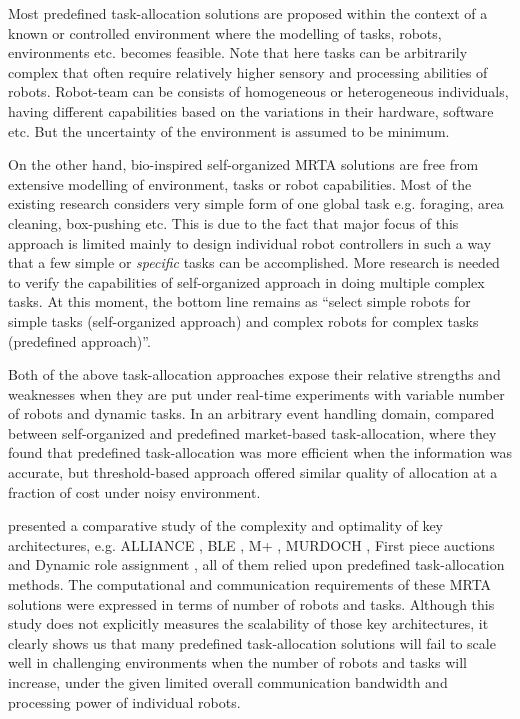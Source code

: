 \documentclass[preprint,12pt]{elsarticle}
\begin{document}
Most predefined task-allocation solutions are proposed within the context of a known or controlled environment where the modelling of tasks, robots, environments etc. becomes feasible. Note that here tasks can be arbitrarily complex that often require relatively higher sensory and processing abilities of robots. Robot-team can be consists of homogeneous or heterogeneous individuals, having different capabilities based on the variations in their hardware, software etc. But the uncertainty of the environment is assumed to be minimum. 

On the other hand, bio-inspired self-organized MRTA solutions are free from extensive modelling of environment, tasks or robot capabilities. Most of the existing research considers very simple form of one global task e.g. foraging, area cleaning, box-pushing etc. This is due to the fact that major focus of this approach is limited mainly to design individual robot controllers in such a way that a few simple  or {\em specific} tasks can be accomplished. More research is needed to verify the capabilities of self-organized approach in doing multiple complex tasks. At this moment, the bottom line remains as ``select simple robots for simple tasks (self-organized approach) and complex robots for complex tasks (predefined approach)''.

Both of the above task-allocation approaches expose their relative strengths and weaknesses when they are put under real-time experiments with variable number of robots and dynamic tasks. In an arbitrary event handling domain, \citet{kalra+2007}  compared between self-organized and predefined market-based task-allocation,  where they found that predefined  task-allocation was more efficient when the information was accurate, but threshold-based  approach offered similar quality of allocation at a fraction of cost  under noisy environment.  

\citet{Gerkey+2003} presented a comparative study of  the complexity and optimality of key architectures, e.g.  ALLIANCE \cite{Parker1998}, BLE \cite{Werger2001}, M+ \cite{Botelho+1999}, MURDOCH \cite{Gerkey+2002}, First piece auctions \cite{Zlot+2002} and Dynamic role assignment \cite{Chaimowicz2002}, all of them relied upon predefined task-allocation methods. The computational and communication requirements of these MRTA solutions were expressed in terms of number of robots and tasks. Although this study does not explicitly measures the scalability of those key architectures, it clearly shows us that many predefined task-allocation solutions will fail to scale well in challenging environments  when the number of  robots and tasks will increase, under the given limited overall communication bandwidth and processing power of individual robots. 
\end{document}
